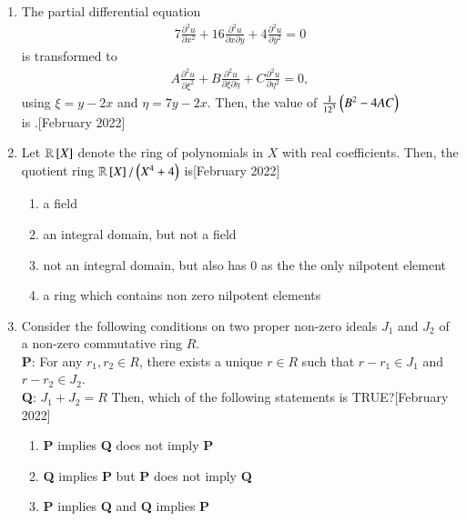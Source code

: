 \documentclass[journal]{IEEEtran}
\begin{document}
\begin{enumerate}
$J_{\alpha-1}\brak{x} + J_{\alpha+1}\brak{x} = \frac{2 \alpha}{x} J_{\alpha}(x)$.
Then, the value of $\brak{\pi J_{\frac{3}{2}}\brak{\pi}}^2$ is \underline{\hspace{2cm}}.\hfill[February 2022] 
\item The partial differential equation
\begin{align}
7 \frac{\partial^2 u}{\partial x^2} + 16 \frac{\partial^2 u}{\partial x \partial y} + 4 \frac{\partial^2 u}{\partial y^2} = 0
\end{align}
is transformed to
\begin{align}
A \frac{\partial^2 u}{\partial \xi^2} + B \frac{\partial^2 u}{\partial \xi \partial \eta} + C \frac{\partial^2 u}{\partial \eta^2} = 0,
\end{align}
using $\xi = y - 2x$ and $\eta = 7y - 2x$.
Then, the value of $\frac{1}{{12}^3} \left(B^2 - 4AC\right)$ \\is \underline{\hspace{2cm}}.\hfill[February 2022]
\item Let $\mathbb{R}{}\left[X\right]$ denote the ring of polynomials in $X$ with real coefficients. Then, the quotient ring $\mathbb{R}{}\left[X\right]/\left(X^4 + 4\right)$ is\hfill[February 2022]
\begin{enumerate}
    \item a field
    \item an integral domain, but not a field
    \item not an integral domain, but also has $0$ as the the only nilpotent element
    \item a ring which contains non zero nilpotent elements
\end{enumerate}
\item Consider the following conditions on two proper non-zero ideals $J_1$ and $J_2$ of a non-zero commutative ring $R$.
\\\textbf{P}: For any $r_1, r_2 \in R$, there exists a unique $r \in R$ such that $r - r_1 \in J_1$ and $r - r_2 \in J_2$.
\\\textbf{Q}: $J_1 + J_2 = R$
Then, which of the following statements is TRUE?\hfill[February 2022]
\begin{enumerate}
    \item \textbf{P} implies \textbf{Q} does not imply \textbf{P}
    \item \textbf{Q} implies \textbf{P} but \textbf{P} does not imply \textbf{Q}
    \item \textbf{P} implies \textbf{Q} and \textbf{Q} implies \textbf{P}

\end{enumerate}
\end{enumerate}
\end{document}
